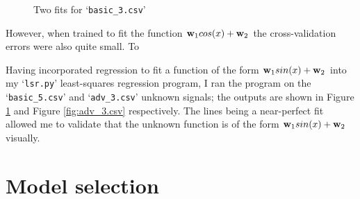 \documentclass[onecolumn, 12pt, a4paper]{article}
\begin{document}
\begin{figure}[htbp]
    \centering
    \hfill
    \caption{Two fits for `\texttt{basic\_3.csv}'}
    \label{fig:basic_5.csv}
\end{figure}

However, when trained to fit the function $\vb{w}_{1}cos(x) + \vb{w}_{2}$
the cross-validation errors were also quite small.
To 

Having incorporated regression to fit a function of the
form $\vb{w}_{1}sin(x) + \vb{w}_{2}$ into my 
`\texttt{lsr.py}'
least-squares regression program, I ran the program on
the `\texttt{basic\_5.csv}' and `\texttt{adv\_3.csv}'
unknown signals;
the outputs are shown in Figure \ref{fig:basic_5.csv}
and Figure \ref{fig:adv_3.csv} respectively.
The lines being a near-perfect fit allowed me to
validate that the unknown function is of
the form $\vb{w}_{1}sin(x) + \vb{w}_{2}$ visually.

\section{Model selection}
\end{document}
